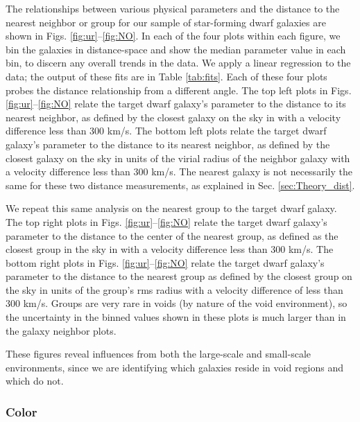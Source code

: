 The relationships between various physical parameters and the distance to the 
nearest neighbor or group for our sample of star-forming dwarf galaxies are 
shown in Figs. \ref{fig:ur}--\ref{fig:NO}.  In each of the four plots within 
each figure, we bin the galaxies in distance-space and show the median parameter 
value in each bin, to discern any overall trends in the data.  We apply a linear 
regression to the data; the output of these fits are in Table \ref{tab:fits}.  
Each of these four plots probes the distance relationship from a different 
angle.  The top left plots in Figs. \ref{fig:ur}--\ref{fig:NO} relate the target 
dwarf galaxy's parameter to the distance to its nearest neighbor, as defined by 
the closest galaxy on the sky in \hMpc with a velocity difference less than 300 
km/s.  The bottom left plots relate the target dwarf galaxy's parameter to the 
distance to its nearest neighbor, as defined by the closest galaxy on the sky in 
units of the virial radius of the neighbor galaxy with a velocity difference 
less than 300 km/s.  The nearest galaxy is not necessarily the same for these 
two distance measurements, as explained in Sec. \ref{sec:Theory_dist}.

We repeat this same analysis on the nearest group to the target dwarf galaxy.  
The top right plots in Figs. \ref{fig:ur}--\ref{fig:NO} relate the target dwarf 
galaxy's parameter to the distance to the center of the nearest group, as 
defined as the closest group in the sky in \hMpc with a velocity difference less 
than 300 km/s.  The bottom right plots in Figs. \ref{fig:ur}--\ref{fig:NO} 
relate the target dwarf galaxy's parameter to the distance to the nearest group 
as defined by the closest group on the sky in units of the group's rms radius 
with a velocity difference of less than 300 km/s.  Groups are very rare in voids 
(by nature of the void environment), so the uncertainty in the binned values 
shown in these plots is much larger than in the galaxy neighbor plots.

These figures reveal influences from both the large-scale and small-scale 
environments, since we are identifying which galaxies reside in void regions and 
which do not.


\subsubsection{Color}


